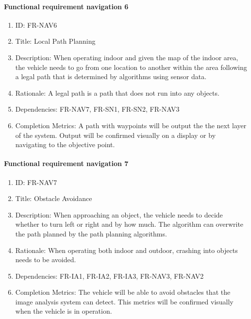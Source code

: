 \documentclass[compsoc,draftclsnofoot,onecolumn,10pt]{IEEEtran}
\begin{document}
	\paragraph{Functional requirement navigation 6}
		\begin{enumerate}
			\item ID: FR-NAV6
			\item Title: Local Path Planning
			\item Description: When operating indoor and given the map of the indoor area, the vehicle needs to go from one location to another within the area following a legal path that is determined by algorithms using sensor data.
			\item Rationale: A legal path is a path that does not run into any objects.
			\item Dependencies: FR-NAV7, FR-SN1, FR-SN2, FR-NAV3
			\item Completion Metrics: A path with waypoints will be output the the next layer of the system. 
			Output will be confirmed visually on a display or by navigating to the objective point.  
		\end{enumerate}

	\paragraph{Functional requirement navigation 7}
		\begin{enumerate}
			\item ID: FR-NAV7
			\item Title: Obstacle Avoidance
			\item Description: When approaching an object, the vehicle needs to decide whether to turn left or right and by how much. The algorithm can overwrite the path planned by the path planning algorithms.
			\item Rationale: When operating both indoor and outdoor, crashing into objects needs to be avoided. 
			\item Dependencies: FR-IA1, FR-IA2, FR-IA3, FR-NAV3, FR-NAV2
			\item Completion Metrics: The vehicle will be able to avoid obstacles that the image analysis system can detect. This metrics will be confirmed visually when the vehicle is in operation.  
		\end{enumerate}
\end{document}
